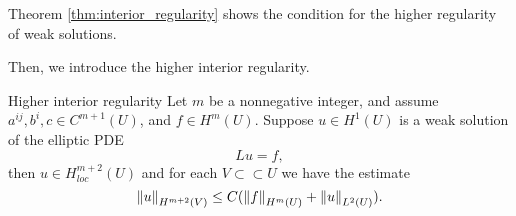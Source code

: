 \begin{remark}
    Theorem \ref{thm:interior_regularity} shows the condition for the higher regularity of weak solutions.
\end{remark}
Then, we introduce the higher interior regularity.
\begin{theorem}{Higher interior regularity}
    \label{thm:higher_int_regular}
    Let $m$ be a nonnegative integer, and assume $a^{ij},b^{i},c\in C^{m+1}(U)$, and $f\in H^{m}(U)$. Suppose $u\in H^{1}(U)$ is a weak solution of the elliptic PDE
    \begin{equation}
        Lu=f,
    \end{equation}
    then $u\in H_{loc}^{m+2}(U)$ and for each $V\subset\subset U$ we have the estimate 
    \begin{equation}
        \left\|u\right\|_{H^{m+2}(V)}\le C(\left\|f\right\|_{H^{m}(U)}+\left\|u\right\|_{L^{2}(U)}).
    \end{equation}
\end{theorem}
